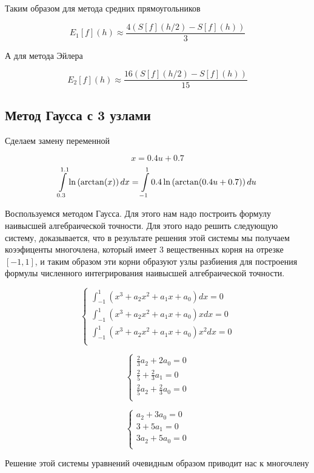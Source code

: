\documentclass[11pt,a4paper,oneside]{article}
\begin{document}
Таким образом для метода средних прямоугольников

$$ E_1[f](h) \approx \frac{4 \left( S[f](h / 2) - S[f](h) \right)}{3} $$

А для метода Эйлера

$$ E_2[f](h) \approx \frac{16 \left( S[f](h / 2) - S[f](h) \right)}{15} $$

\subsection{Метод Гаусса с 3 узлами}

Сделаем замену переменной

$$ x = 0.4 u + 0.7 $$
$$ \int\displaylimits_{0.3}^{1.1} \ln \left( \arctan(x) \right) dx
	= \int\displaylimits_{-1}^{1} 0.4 \ln \left( \arctan(0.4 u + 0.7) \right) du $$
	
Воспользуемся методом Гаусса. Для этого нам надо построить формулу наивысшей алгебраической точности. Для этого надо решить следующую систему, доказывается, что в результате решения этой системы мы получаем коээфиценты многочлена, который имеет 3 вещественных корня на отрезке $[-1, 1]$, и таким образом эти корни образуют узлы разбиения для построения формулы численного интегрирования наивысшей алгебраической точности.

$$
\left\{ \begin{array}{l}
	\int_{-1}^{1} (x^3 + a_2 x^2 + a_1 x + a_0) dx = 0 \\
	\int_{-1}^{1} (x^3 + a_2 x^2 + a_1 x + a_0) x dx = 0 \\
	\int_{-1}^{1} (x^3 + a_2 x^2 + a_1 x + a_0) x^2 dx = 0 \\
\end{array} \right.
$$

$$
\left\{ \begin{array}{l}
	\frac{2}{3} a_2 + 2 a_0 = 0 \\
	\frac{2}{5} + \frac{2}{3} a_1 = 0 \\
	\frac{2}{5} a_2 + \frac{2}{3} a_0 = 0 \\
\end{array} \right.
$$

$$
\left\{ \begin{array}{l}
	a_2 + 3 a_0 = 0 \\
	3 + 5 a_1 = 0 \\
	3 a_2 + 5 a_0 = 0 \\
\end{array} \right.
$$

Решение этой системы уравнений очевидным образом приводит нас к многочлену
\end{document}
